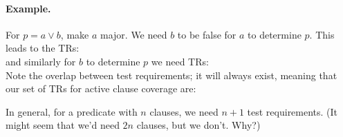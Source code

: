 \documentclass[11pt]{article}
\newcommand{\true}{\mbox{\sf true}}
\newcommand{\false}{\mbox{\sf false}}
\begin{document}
\paragraph{Example.} For $p = a \vee b$, make $a$ major. We need
$b$ to be false for $a$ to determine $p$. {\sf This leads to the TRs:} \\[1em]
and similarly for $b$ to determine $p$ {\sf we need TRs:}\\[1em]
Note the overlap between test requirements; it will always exist, meaning
that {\sf our set of TRs for active clause coverage are:}

In general, for a predicate with $n$ clauses, we need $n+1$ test requirements.
(It might seem that we'd need $2n$ clauses, but we don't. Why?)
\end{document}
